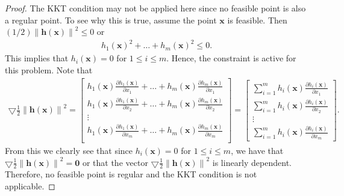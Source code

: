 \documentclass[12pt]{article}
\theoremstyle{definition}
\newcommand{\vc}[1]{\boldsymbol{#1}}
\newcommand{\norm}[1]{\left\lVert#1\right\rVert}
\begin{document}
\begin{proof}
  The KKT condition may not be applied here since no feasible point is also a regular point. To see why this
  is true, assume the point $\vc{x}$ is feasible. Then $(1/2)\norm{\vc{h}(\vc{x})}^2 \leq 0$ or
  \begin{align*}
    h_1(\vc{x})^2 + \dots + h_m(\vc{x})^2 \leq 0.
  \end{align*}
  This implies that $h_i(\vc{x}) = 0$ for $1\leq i \leq m$. Hence, the constraint is active for this
  problem. Note that
  \begin{align*}
    \bigtriangledown \frac{1}{2}\norm{\vc{h}(\vc{x})}^2 =
    \begin{bmatrix}
      h_1(\vc{x}) \frac{\partial h_1(\vc{x})}{\partial x_1} + \dots + h_m(\vc{x}) \frac{\partial h_m(\vc{x})}{\partial x_1}\\
      h_1(\vc{x}) \frac{\partial h_1(\vc{x})}{\partial x_2} + \dots + h_m(\vc{x}) \frac{\partial h_m(\vc{x})}{\partial x_2}\\
      \vdots \\
      h_1(\vc{x}) \frac{\partial h_1(\vc{x})}{\partial x_m} + \dots + h_m(\vc{x}) \frac{\partial h_m(\vc{x})}{\partial x_m}\\
    \end{bmatrix}
    =
    \begin{bmatrix}
      \sum_{i=1}^m h_i(\vc{x}) \frac{\partial h_i(\vc{x})}{\partial x_1}\\
      \sum_{i=1}^m h_i(\vc{x}) \frac{\partial h_i(\vc{x})}{\partial x_2}\\
      \vdots\\
      \sum_{i=1}^m h_i(\vc{x}) \frac{\partial h_i(\vc{x})}{\partial x_m}
    \end{bmatrix}.
  \end{align*}
  From this we clearly see that since $h_i(\vc{x}) = 0$ for $1\leq i \leq m$, we have that
  $\bigtriangledown \frac{1}{2}\norm{\vc{h}(\vc{x})}^2 = \vc{0}$ or that the vector
  $\bigtriangledown \frac{1}{2}\norm{\vc{h}(\vc{x})}^2$ is linearly dependent. Therefore, no feasible point is regular
  and the KKT condition is not applicable.
\end{proof}
\end{document}
